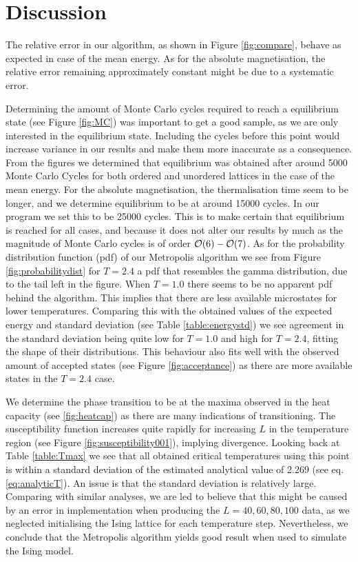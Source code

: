 \section{Discussion}
\label{sec:discussion}
The relative error in our algorithm, as shown in Figure \ref{fig:compare}, behave as expected in case of the mean energy. As for the absolute magnetisation, the relative error remaining approximately constant might be due to a systematic error.

Determining the amount of Monte Carlo cycles required to reach a equilibrium state (see Figure \ref{fig:MC}) was important to get a good sample, as we are only interested in the equilibrium state. Including the cycles before this point would increase variance in our results and make them more inaccurate as a consequence. From the figures we determined that equilibrium was obtained after around 5000 Monte Carlo Cycles for both ordered and unordered lattices in the case of the mean energy. For the absolute magnetisation, the thermalisation time seem to be longer, and we determine equilibrium to be at around 15000 cycles. In our program we set this to be 25000 cycles. This is to make certain that equilibrium is reached for all cases, and because it does not alter our results by much as the magnitude of Monte Carlo cycles is of order $\order{6} - \order{7}$. As for the probability distribution function (pdf) of our Metropolis algorithm we see from Figure \ref{fig:probabilitydist} for $T=2.4$ a pdf that resembles the gamma distribution, due to the tail left in the figure. When $T=1.0$ there seems to be no apparent pdf behind the algorithm. This implies that there are less available microstates for lower temperatures. Comparing this with the obtained values of the expected energy and standard deviation (see Table \ref{table:energystd}) we see agreement in the standard deviation being quite low for $T=1.0$ and high for $T=2.4$, fitting the shape of their distributions. This behaviour also fits well with the observed amount of accepted states (see Figure \ref{fig:acceptance}) as there are more available states in the $T=2.4$ case.

We determine the phase transition to be at the maxima observed in the heat capacity (see \ref{fig:heatcap}) as there are many indications of transitioning. The susceptibility function increases quite rapidly for increasing $L$ in the temperature region (see Figure \ref{fig:susceptibility001}), implying divergence. Looking back at Table \ref{table:Tmax} we see that all obtained critical temperatures using this point is within a standard deviation of the estimated analytical value of 2.269 (see eq.\ref{eq:analyticT}). An issue is that the standard deviation is relatively large. Comparing with similar analyses, we are led to believe that this might be caused by an error in implementation when producing the $L= 40, 60, 80, 100$ data, as we neglected initialising the Ising lattice for each temperature step. Nevertheless, we conclude that the Metropolis algorithm yields good result when used to simulate the Ising model.
